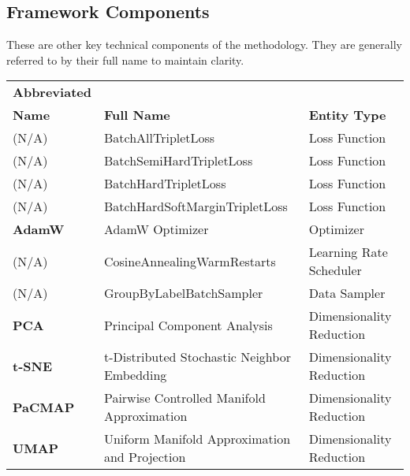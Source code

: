 \documentclass[11pt]{article}
\begin{document}
\subsection*{Framework Components}
These are other key technical components of the methodology. They are generally referred to by their full name to maintain clarity.
\begin{table}[h!]
\centering
\begin{tabular}{@{}lp{}p{}@{}}
\toprule
\textbf{Abbreviated} &                                       &          \\ 
\textbf{Name} & \textbf{Full Name}                                      & \textbf{Entity Type}         \\ \midrule
(N/A)                     & BatchAllTripletLoss                                     & Loss Function                \\
(N/A)                     & BatchSemiHardTripletLoss                                & Loss Function                \\
(N/A)                     & BatchHardTripletLoss                                    & Loss Function                \\
(N/A)                     & BatchHardSoftMarginTripletLoss                          & Loss Function                \\
\textbf{AdamW}            & AdamW Optimizer                                         & Optimizer                    \\
(N/A)                     & CosineAnnealingWarmRestarts                             & Learning Rate Scheduler      \\
(N/A)                     & GroupByLabelBatchSampler                                & Data Sampler                 \\
\textbf{PCA}              & Principal Component Analysis                            & Dimensionality Reduction     \\
\textbf{t-SNE}            & t-Distributed Stochastic Neighbor Embedding             & Dimensionality Reduction     \\
\textbf{PaCMAP}           & Pairwise Controlled Manifold Approximation              & Dimensionality Reduction     \\
\textbf{UMAP}             & Uniform Manifold Approximation and Projection           & Dimensionality Reduction     \\ \bottomrule
\end{tabular}
\end{table}
\end{document}
